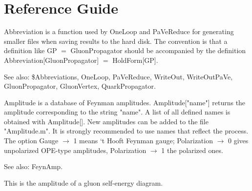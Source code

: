 \chapter{Reference Guide}
\label{rg}




Abbreviation is a function used by OneLoop and PaVeReduce for generating smaller files when saving results to the hard disk. The
  convention is that a definition like GP \(=\) GluonPropagator should be accompanied by the definition Abbreviation[GluonPropagator]
  \(=\) HoldForm[GP].

See also: { }\${}Abbreviations, OneLoop, PaVeReduce, WriteOut, WriteOutPaVe, GluonPropagator, GluonVertex, QuarkPropagator.






Amplitude is a database of Feynman amplitudes. Amplitude["name"] returns the amplitude corresponding to the string "name". A list of all
  defined names is obtained with Amplitude[]. New amplitudes can be added to the file "Amplitude.m". It is strongly recommended to use
  names that reflect the process. The option Gauge \(\rightarrow \) 1 means `t Hooft Feynman gauge; Polarization \(\rightarrow \) 0 gives
  unpolarized OPE-type amplitudes, Polarization \(\rightarrow \) 1 the polarized ones.



See also:  FeynAmp.




This is the amplitude of a gluon self-energy diagram.


